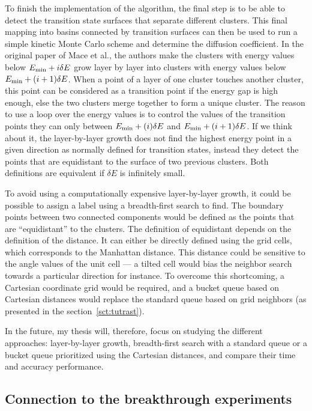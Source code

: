 \documentclass[main]{subfiles}
\begin{document}
To finish the implementation of the algorithm, the final step is to be able to detect the transition state surfaces that separate different clusters. This final mapping into basins connected by transition surfaces can then be used to run a simple kinetic Monte Carlo scheme and determine the diffusion coefficient. In the original paper of Mace et al.\autocite{Mace_2019}, the authors make the clusters with energy values below $E_{\text{min}}+i\delta E$ grow layer by layer into clusters with energy values below $E_{\text{min}}+(i+1)\delta E$. When a point of a layer of one cluster touches another cluster, this point can be considered as a transition point if the energy gap is high enough, else the two clusters merge together to form a unique cluster. The reason to use a loop over the energy values is to control the values of the transition points they can only between $E_{\text{min}}+(i)\delta E$ and $E_{\text{min}}+(i+1)\delta E$. If we think about it, the layer-by-layer growth does not find the highest energy point in a given direction as normally defined for transition states, instead they detect the points that are equidistant to the surface of two previous clusters. Both definitions are equivalent if $\delta E$ is infinitely small.

To avoid using a computationally expensive layer-by-layer growth, it could be possible to assign a label using a breadth-first search to find. The boundary points between two connected components would be defined as the points that are ``equidistant'' to the clusters. The definition of equidistant depends on the definition of the distance. It can either be directly defined using the grid cells, which corresponds to the Manhattan distance. This distance could be sensitive to the angle values of the unit cell --- a tilted cell would bias the neighbor search towards a particular direction for instance. To overcome this shortcoming, a Cartesian coordinate grid would be required, and a bucket queue based on Cartesian distances would replace the standard queue based on grid neighbors (as presented in the section~\ref{sct:tutrast}).

In the future, my thesis will, therefore, focus on studying the different approaches: layer-by-layer growth, breadth-first search with a standard queue or a bucket queue prioritized using the Cartesian distances, and compare their time and accuracy performance.

\subsection{Connection to the breakthrough experiments}
\end{document}
